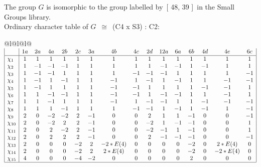 \documentclass[varwidth=\maxdimen,border=10]{standalone}
\begin{document}
The group $G$ is isomorphic to the group labelled by\ [ 48, 39 ]\ in the Small Groups library.\\
Ordinary character table of $G$\ $\cong$\ (C4 x S3) : C2:\\
\begin{center}
\begin{tabular}{@{}l@{}l@{}l@{}}
\hline
\(\begin{array}{|l|ccccccccccccccc|}
  & 1a & 2a & 4a & 2b & 2c & 3a & 4b & 4c & 2d & 12a & 6a & 6b & 4d & 4e & 6c\\ \hline
\chi_{1} & 1 & 1 & 1 & 1 & 1 & 1 & 1 & 1 & 1 & 1 & 1 & 1 & 1 & 1 & 1\\
\chi_{2} & 1 & -1 & -1 & -1 & 1 & 1 & 1 & 1 & 1 & -1 & -1 & 1 & -1 & 1 & 1\\
\chi_{3} & 1 & -1 & -1 & 1 & 1 & 1 & 1 & -1 & -1 & -1 & 1 & 1 & 1 & 1 & -1\\
\chi_{4} & 1 & -1 & 1 & -1 & 1 & 1 & -1 & 1 & -1 & 1 & -1 & 1 & 1 & -1 & -1\\
\chi_{5} & 1 & -1 & 1 & 1 & 1 & 1 & -1 & -1 & 1 & 1 & 1 & 1 & -1 & -1 & 1\\
\chi_{6} & 1 & 1 & -1 & -1 & 1 & 1 & -1 & -1 & 1 & -1 & -1 & 1 & 1 & -1 & 1\\
\chi_{7} & 1 & 1 & -1 & 1 & 1 & 1 & -1 & 1 & -1 & -1 & 1 & 1 & -1 & -1 & -1\\
\chi_{8} & 1 & 1 & 1 & -1 & 1 & 1 & 1 & -1 & -1 & 1 & -1 & 1 & -1 & 1 & -1\\
\chi_{9} & 2 & 0 & -2 & -2 & 2 & -1 & 0 & 0 & 2 & 1 & 1 & -1 & 0 & 0 & -1\\
\chi_{10} & 2 & 0 & -2 & 2 & 2 & -1 & 0 & 0 & -2 & 1 & -1 & -1 & 0 & 0 & 1\\
\chi_{11} & 2 & 0 & 2 & -2 & 2 & -1 & 0 & 0 & -2 & -1 & 1 & -1 & 0 & 0 & 1\\
\chi_{12} & 2 & 0 & 2 & 2 & 2 & -1 & 0 & 0 & 2 & -1 & -1 & -1 & 0 & 0 & -1\\
\chi_{13} & 2 & 0 & 0 & 0 & -2 & 2 & -2*E(4) & 0 & 0 & 0 & 0 & -2 & 0 & 2*E(4) & 0\\
\chi_{14} & 2 & 0 & 0 & 0 & -2 & 2 & 2*E(4) & 0 & 0 & 0 & 0 & -2 & 0 & -2*E(4) & 0\\
\chi_{15} & 4 & 0 & 0 & 0 & -4 & -2 & 0 & 0 & 0 & 0 & 0 & 2 & 0 & 0 & 0\\
\hline
\end{array}\)\\
\end{tabular}
\end{center}
\end{document}
